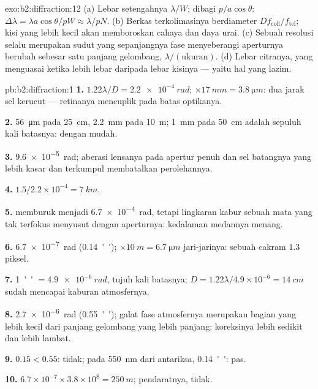 \begin{solution}{exo:b2:diffraction:12}
(a) Lebar setengahnya $\lambda/W$; dibagi $p/a\cos\theta$: $\Delta\lambda = \lambda a\cos\theta/pW \approx
\lambda/pN$. (b) Berkas terkolimasinya berdiameter $Df_{\text{coll}}/f_{\text{tel}}$;
kisi yang lebih kecil akan memboroskan cahaya dan daya urai. (c) Sebuah
resolusi selalu merupakan sudut yang sepanjangnya fase menyeberangi
aperturnya berubah sebesar satu panjang gelombang, $\lambda/(\text{ukuran})$. (d) Lebar
citranya, yang menguasai ketika lebih lebar daripada lebar 
kisinya --- yaitu hal yang lazim.
\end{solution}

\begin{solution}{pb:b2:diffraction:1}
\textbf{1.} $1.22\lambda/D = \qty{2.2e-4}{rad}$; $\times\qty{17}{mm} = \qty{3.8}{\micro m}$: dua jarak
sel kerucut --- retinanya mencuplik pada batas optikanya.

\textbf{2.} \qty{56}{\micro m} pada \qty{25}{cm}, \qty{2.2}{mm} pada \qty{10}{m}; \qty{1}{mm} pada
\qty{50}{cm} adalah sepuluh kali batasnya: dengan mudah.

\textbf{3.} \qty{9.6e-5}{rad}; aberasi lensanya pada apertur penuh dan
sel batangnya yang lebih kasar dan terkumpul membatalkan perolehannya.

\textbf{4.} $1.5/2.2 \times 10^{-4} = \qty{7}{km}$.

\textbf{5.}  memburuk menjadi \qty{6.7e-4}{rad}, tetapi lingkaran kabur
sebuah mata yang tak terfokus menyusut dengan aperturnya: kedalaman medannya menang.

\textbf{6.} \qty{6.7e-7}{rad} (\qty{0.14}{''}); $\times\qty{10}{m} = \qty{6.7}{\micro m}$ jari-jarinya: sebuah
cakram $1.3$ piksel.

\textbf{7.} \qty{1}{''} $= \qty{4.9e-6}{rad}$, tujuh kali batasnya; $D = 1.22\lambda/4.9
\times 10^{-6} = \qty{14}{cm}$ sudah mencapai kaburan atmosfernya.

\textbf{8.} \qty{2.7e-6}{rad} (\qty{0.55}{''}); galat fase atmosfernya merupakan
bagian yang lebih kecil dari panjang gelombang yang lebih panjang: koreksinya lebih sedikit dan lebih lambat.

\textbf{9.} $0.15 < 0.55$: tidak; pada \qty{550}{nm} dari antariksa, \qty{0.14}{''}: pas.

\textbf{10.} $6.7 \times 10^{-7} \times 3.8 \times 10^8 = \qty{250}{m}$; pendaratnya, tidak.


\end{solution}
